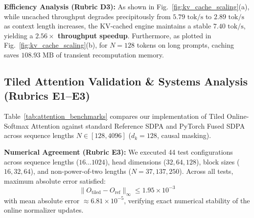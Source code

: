 \documentclass[conference]{IEEEtran}
\begin{document}
\textbf{Efficiency Analysis (Rubric D3):} As shown in Fig.~\ref{fig:kv_cache_scaling}(a), while uncached throughput degrades precipitously from $5.79\text{ tok/s}$ to $2.89\text{ tok/s}$ as context length increases, the KV-cached engine maintains a stable $7.40\text{ tok/s}$, yielding a \textbf{$2.56\times$ throughput speedup}. Furthermore, as plotted in Fig.~\ref{fig:kv_cache_scaling}(b), for $N=128$ tokens on long prompts, caching saves \textbf{$108.93\text{ MB}$} of transient recomputation memory.

\subsection{Tiled Attention Validation \& Systems Analysis (Rubrics E1--E3)}
Table~\ref{tab:attention_benchmarks} compares our implementation of Tiled Online-Softmax Attention against standard Reference SDPA and PyTorch Fused SDPA across sequence lengths $N \in [128, 4096]$ ($d_k=128$, causal masking).

\begin{table}[htbp]
\caption{Attention Scaling: Memory and Runtime Comparison}
\label{tab:attention_benchmarks}
\centering
{}
\end{table}

\textbf{Numerical Agreement (Rubric E3):} We executed 44 test configurations across sequence lengths ($16 \dots 1024$), head dimensions ($32, 64, 128$), block sizes ($16, 32, 64$), and non-power-of-two lengths ($N=37, 137, 250$). Across all tests, maximum absolute error satisfied:
\begin{equation}
    \|O_{\text{tiled}} - O_{\text{ref}}\|_\infty \le 1.95 \times 10^{-3}
\end{equation}
with mean absolute error $\approx 6.81 \times 10^{-5}$, verifying exact numerical stability of the online normalizer updates.
\end{document}
